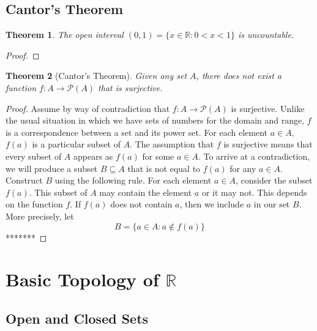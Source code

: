 \documentclass[10pt]{report}
\newtheorem{thm2}{Theorem}[section]
\begin{document}
\section{Cantor's Theorem}
\begin{thm2}
The open interval $(0,1)=\{x\in \mathbb{R}: 0<x<1\}$ is uncountable.
\end{thm2}
\begin{proof}

\end{proof}
\begin{thm2}[Cantor's Theorem]
Given any set $A$, there does not exist a function $f:A\to \mathcal{P}(A)$ that is surjective.
\end{thm2}
\begin{proof}
Assume by way of contradiction that $f:A\to\mathcal{P}(A)$ is surjective. Unlike the usual situation in which we have sets of numbers for the domain and range, $f$ is a correspondence between a set and its power set. For each element $a\in A$, $f(a)$ is a particular subset of $A$. The assumption that $f$ is surjective means that every subset of $A$ appears as $f(a)$ for some $a\in A$. To arrive at a contradiction, we will produce a subset $B\subseteq A$ that is not equal to $f(a)$ for any $a\in A$.\\
Construct $B$ using the following rule. For each element $a\in A$, consider the subset $f(a)$. This subset of $A$ may contain the element $a$ or it may not. This depends on the function $f$. If $f(a)$ does not contain $a$, then we include $a$ in our set $B$. More precisely, let
$$B = \{a\in A: a \notin f(a)\}$$
*******
\end{proof}

\chapter{Basic Topology of $\mathbb{R}$}
\section{Open and Closed Sets}
\end{document}
